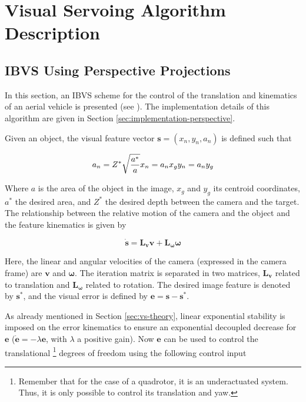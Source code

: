 
\chapter{Visual Servoing Algorithm Description}
\label{chap:algorithm-drescription}

\section{IBVS Using Perspective Projections}

In this section, an IBVS scheme for the control of the translation and kinematics of an aerial vehicle is presented (see \cite{bourquardez_2009}). The implementation details of this algorithm are given in Section \ref{sec:implementation-perspective}. 

Given an object, the visual feature vector $\bm{s} = (x_n, y_n, a_n)$ is defined such that

\begin{equation*}
a_n = Z^\ast \sqrt{\frac{a^\ast}{a}} \\
x_n = a_n x_g \\
 y_n = a_n y_g 
\end{equation*}

Where $a$ is the area of the object in the image, $x_g$ and $y_g$ its centroid coordinates, $a^\ast$ the desired area, and $Z^\ast$ the desired depth between the camera and the target. The relationship between the relative motion of the camera and the object and the feature kinematics is given by

\begin{equation}
\dot{\bm{s}} = \bm{L_v} \bm{v} + \bm{L_\omega} \bm{\omega}
\end{equation}

Here, the linear and angular velocities of the camera (expressed in the camera frame) are $\bm{v}$ and $\bm{\omega}$. The iteration matrix is separated in two matrices, $\bm{L_v}$ related to translation and $\bm{L_\omega}$ related to rotation. The desired image feature is denoted by $\bm{s}^\ast$, and the visual error is defined by $\bm{e} = \bm{s} - \bm{s}^\ast$.

As already mentioned in Section \ref{sec:vs-theory}, linear exponential stability is imposed on the error kinematics to ensure an exponential decoupled decrease for $\bm{e}$ ($\dot{\bm{e}} = - \lambda \bm{e}$, with $\lambda$ a positive gain). Now $\bm{e}$ can be used to control the translational \footnote{Remember that for the case of a quadrotor, it is an underactuated system. Thus, it is only possible to control its translation and yaw.} degrees of freedom using the following control input

